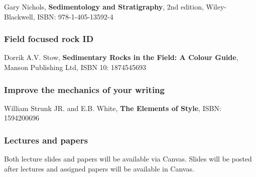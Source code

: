 \documentclass[11pt,]{article}
\begin{document}
Gary Nichols, \textbf{Sedimentology and Stratigraphy}, 2nd edition,
Wiley-Blackwell, ISBN: 978-1-405-13592-4

\hypertarget{field-focused-rock-id}{%
\subsubsection{Field focused rock ID}\label{field-focused-rock-id}}

Dorrik A.V. Stow, \textbf{Sedimentary Rocks in the Field: A Colour
Guide}, Manson Publishing Ltd, ISBN 10: 1874545693

\hypertarget{improve-the-mechanics-of-your-writing}{%
\subsubsection{Improve the mechanics of your
writing}\label{improve-the-mechanics-of-your-writing}}

William Strunk JR. and E.B. White, \textbf{The Elements of Style}, ISBN:
1594200696

\hypertarget{lectures-and-papers}{%
\subsubsection{Lectures and papers}\label{lectures-and-papers}}

Both lecture slides and papers will be available via Canvas. Slides will
be posted after lectures and assigned papers will be available in
Canvas.

\newpage
\end{document}
